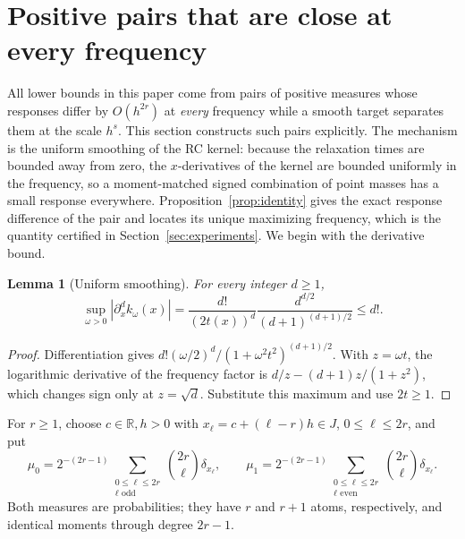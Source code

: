 \documentclass[10pt]{amsart}
\newtheorem{lemma}[theorem]{Lemma}
\theoremstyle{definition}
\theoremstyle{remark}
\theoremstyle{plain}
\newcommand{\R}{\mathbb R}
\begin{document}
\section{Positive pairs that are close at every frequency}\label{sec:pair}
All lower bounds in this paper come from pairs of positive measures whose responses differ by $O(h^{2r})$ at \emph{every} frequency while a smooth target separates them at the scale $h^{s}$. This section constructs such pairs explicitly. The mechanism is the uniform smoothing of the RC kernel: because the relaxation times are bounded away from zero, the $x$-derivatives of the kernel are bounded uniformly in the frequency, so a moment-matched signed combination of point masses has a small response everywhere. Proposition~\ref{prop:identity} gives the exact response difference of the pair and locates its unique maximizing frequency, which is the quantity certified in Section~\ref{sec:experiments}. We begin with the derivative bound.
\begin{lemma}[Uniform smoothing]\label{lem:derivative}
For every integer $d\ge1$,
\begin{equation}\label{eq:derivative}
 \sup_{\omega>0}|\partial_x^dk_\omega(x)|
 =\frac{d!}{(2t(x))^d}\frac{d^{d/2}}{(d+1)^{(d+1)/2}}
 \le d!.
\end{equation}
\end{lemma}
\begin{proof}
Differentiation gives $d!(\omega/2)^d/(1+\omega^2t^2)^{(d+1)/2}$. With $z=\omega t$, the logarithmic derivative of the frequency factor is $d/z-(d+1)z/(1+z^2)$, which changes sign only at $z=\sqrt d$. Substitute this maximum and use $2t\ge1$.
\end{proof}

For $r\ge1$, choose $c\in\R,h>0$ with $x_\ell=c+(\ell-r)h\in J$, $0\le\ell\le2r$, and put
\begin{equation}\label{eq:pair}
 \mu_0=2^{-(2r-1)}\sum_{\substack{0\le\ell\le2r\\\ell\text{ odd}}}\binom{2r}{\ell}\delta_{x_\ell},
 \qquad
 \mu_1=2^{-(2r-1)}\sum_{\substack{0\le\ell\le2r\\\ell\text{ even}}}\binom{2r}{\ell}\delta_{x_\ell}.
\end{equation}
Both measures are probabilities; they have $r$ and $r+1$ atoms, respectively, and identical moments through degree $2r-1$.
\end{document}
